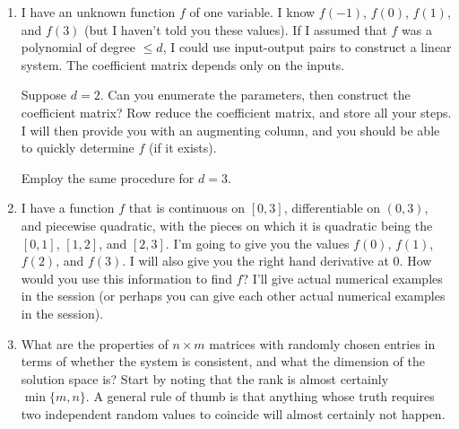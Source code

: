 \documentclass[10pt]{amsart}
\begin{document}
\begin{enumerate}
\item I have an unknown function $f$ of one variable. I know $f(-1)$,
  $f(0)$, $f(1)$, and $f(3)$ (but I haven't told you these values). If
  I assumed that $f$ was a polynomial of degree $\le d$, I could use
  input-output pairs to construct a linear system. The coefficient
  matrix depends only on the inputs.

  Suppose $d = 2$. Can you enumerate the parameters, then construct
  the coefficient matrix? Row reduce the coefficient matrix, and store
  all your steps. I will then provide you with an augmenting column,
  and you should be able to quickly determine $f$ (if it exists).

  Employ the same procedure for $d = 3$.

\item I have a function $f$ that is continuous on $[0,3]$,
  differentiable on $(0,3)$, and piecewise quadratic, with the pieces
  on which it is quadratic being the $[0,1]$, $[1,2]$, and
  $[2,3]$. I'm going to give you the values $f(0)$, $f(1)$, $f(2)$,
  and $f(3)$. I will also give you the right hand derivative at
  $0$. How would you use this information to find $f$?  I'll give
  actual numerical examples in the session (or perhaps you can give
  each other actual numerical examples in the session).

\item What are the properties of $n \times m$ matrices with randomly
  chosen entries in terms of whether the system is consistent, and
  what the dimension of the solution space is? Start by noting that
  the rank is almost certainly $\min \{ m,n \}$. A general rule of
  thumb is that anything whose truth requires two independent random
  values to coincide will almost certainly not happen.
\end{enumerate}
\end{document}
